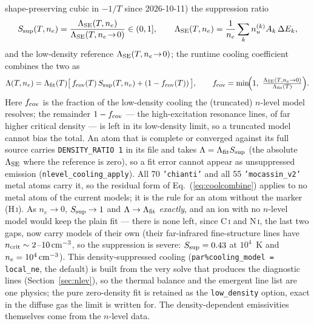 \documentclass[english,a4paper]{my_memo}
\newcommand{\code}[1]{\texttt{#1}}
\begin{document}
shape-preserving cubic in $-1/T$ since 2026-10-11) the suppression ratio
\begin{equation}
  S_{\rm sup}(T,n_e) = \frac{\Lambda_{\rm SE}(T,n_e)}
       {\Lambda_{\rm SE}(T,n_e\!\to\!0)}\in(0,1],
  \qquad
  \Lambda_{\rm SE}(T,n_e) = \frac{1}{n_e}\sum_k n_u^{(k)}A_k\,\Delta E_k,
\end{equation}
and the low-density reference $\Lambda_{\rm SE}(T,n_e\!\to\!0)$; the
runtime cooling coefficient combines the two as
\begin{equation}
  \Lambda(T,n_e) = \Lambda_{\rm fit}(T)\bigl[\,f_{\rm cov}(T)\,
    S_{\rm sup}(T,n_e) + (1 - f_{\rm cov}(T))\,\bigr],
  \qquad
  f_{\rm cov} = \min\!\Bigl(1,\ \tfrac{\Lambda_{\rm SE}(T,n_e\to0)}
       {\Lambda_{\rm fit}(T)}\Bigr).
  \label{eq:coolcombine}
\end{equation}
Here $f_{\rm cov}$ is the fraction of the low-density cooling the (truncated)
$n$-level model resolves; the remainder $1-f_{\rm cov}$ ---
the high-excitation resonance lines, of far higher critical density ---
is left in its low-density limit, so a truncated model cannot bias the
total.  An atom that is complete or converged against its full source
carries \code{DENSITY\_RATIO 1} in its file and takes
$\Lambda = \Lambda_{\rm fit}S_{\rm sup}$ (the absolute $\Lambda_{\rm SE}$
where the reference is zero), so a fit error cannot appear as unsuppressed
emission (\code{nlevel\_cooling\_apply}).  All 70 \code{'chianti'} and all
55 \code{'mocassin\_v2'} metal atoms carry it, so the residual form of
Eq.~(\ref{eq:coolcombine}) applies to no metal atom of the current models;
it is the rule for an atom without the marker (H\,\textsc{i}).  As $n_e\rightarrow0$,
$S_{\rm sup}\rightarrow1$ and
$\Lambda\rightarrow\Lambda_{\rm fit}$ \emph{exactly}, and an ion with no
$n$-level model would keep the plain fit --- there is none left, since
C\,\textsc{i} and N\,\textsc{i}, the last two gaps, now carry models of
their own (their far-infrared fine-structure lines have
$n_{\rm crit} \sim 2$--$10\,{\rm cm^{-3}}$, so the suppression is severe:
$S_{\rm sup} = 0.43$ at $10^4$~K and $n_e = 10^4\,{\rm cm^{-3}}$).
This density-suppressed cooling
(\code{par\%cooling\_model = local\_ne}, the default) is built from the
very solve that produces the diagnostic lines (Section~\ref{sec:nlev}),
so the thermal balance and the emergent line list are one physics; the
pure zero-density fit is retained as the \code{low\_density} option,
exact in the diffuse gas the limit is written for.  The
density-dependent emissivities themselves come from the $n$-level data.
\end{document}
